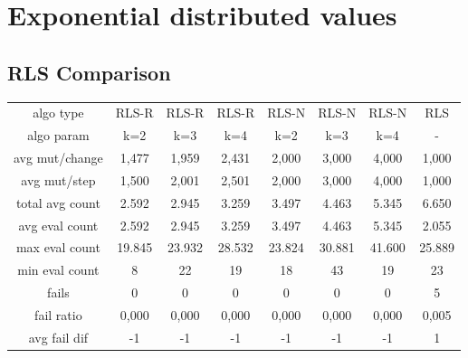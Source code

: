 \section{Exponential distributed values}

\subsection{RLS Comparison}

\begin{tabular}[h]{cccccccc}
algo type&         RLS-R&  RLS-R&  RLS-R&  RLS-N&  RLS-N&  RLS-N&    RLS\\
algo param&          k=2&    k=3&    k=4&    k=2&    k=3&    k=4&      -\\
avg mut/change&    1,477&  1,959&  2,431&  2,000&  3,000&  4,000&  1,000\\
avg mut/step&      1,500&  2,001&  2,501&  2,000&  3,000&  4,000&  1,000\\
\hline
total avg count&   2.592&  2.945&  3.259&  3.497&  4.463&  5.345&  6.650\\
avg eval count&    2.592&  2.945&  3.259&  3.497&  4.463&  5.345&  2.055\\
max eval count&   19.845& 23.932& 28.532& 23.824& 30.881& 41.600& 25.889\\
min eval count&        8&     22&     19&     18&     43&     19&     23\\
\hline
fails&                 0&      0&      0&      0&      0&      0&      5\\
fail ratio&        0,000&  0,000&  0,000&  0,000&  0,000&  0,000&  0,005\\
avg fail dif&         -1&     -1&     -1&     -1&     -1&     -1&      1\\
\end{tabular}

